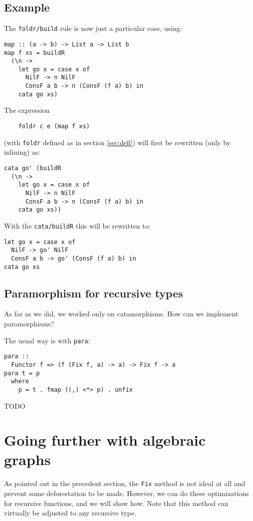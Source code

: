 \documentclass[format=sigplan]{acmart}
\newcommand{\minline}[1]{\texttt{#1}}
\begin{document}
\subsection{Example}
The \verb|foldr/build| rule is now just a particular case, using:
\begin{verbatim}
map :: (a -> b) -> List a -> List b
map f xs = buildR 
  (\n ->
    let go x = case x of
      NilF -> n NilF
      ConsF a b -> n (ConsF (f a) b) in
    cata go xs)
\end{verbatim}

The expression
\begin{verbatim}
	foldr c e (map f xs)
\end{verbatim}
(with \minline{foldr} defined as in section \ref{sec:defi}) will first be rewritten (only by inlining) as:
\begin{verbatim}
cata go' (buildR 
  (\n ->
    let go x = case x of
      NilF -> n NilF
      ConsF a b -> n (ConsF (f a) b) in
    cata go xs))
\end{verbatim}

With the \verb|cata/buildR| this will be rewritten to:
\begin{verbatim}
let go x = case x of
  NilF -> go' NilF
  ConsF a b -> go' (ConsF (f a) b) in
cata go xs
\end{verbatim}

\subsection{Paramorphism for recursive types}
\label{sec:para-rec}
As far as we did, we worked only on catamorphisms. How can we implement paramorphisms?

The usual way is with \minline{para}:
\begin{verbatim}
para ::
  Functor f => (f (Fix f, a) -> a) -> Fix f -> a
para t = p
  where
    p = t . fmap ((,) <*> p) . unfix
\end{verbatim}

TODO

\section{Going further with algebraic graphs}
As pointed out in the precedent section, the \verb|Fix| method is not ideal at all and prevent some deforestation to be made.
However, we can do these optimizations for recursive functions, and we will show how. Note that this method can virtually be adjusted to any recursive type.
\end{document}
